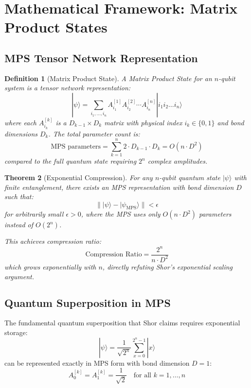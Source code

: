 \documentclass[12pt]{article}
\newtheorem{theorem}{Theorem}[section]
\newtheorem{definition}[theorem]{Definition}
\begin{document}
\section{Mathematical Framework: Matrix Product States}

\subsection{MPS Tensor Network Representation}

\begin{definition}[Matrix Product State]
A Matrix Product State for an $n$-qubit system is a tensor network representation:
\begin{equation}
|\psi\rangle = \sum_{i_1,\ldots,i_n} A^{[1]}_{i_1} A^{[2]}_{i_2} \cdots A^{[n]}_{i_n} |i_1 i_2 \ldots i_n\rangle
\end{equation}
where each $A^{[k]}_{i_k}$ is a $D_{k-1} \times D_k$ matrix with physical index $i_k \in \{0,1\}$ and bond dimensions $D_k$. The total parameter count is:
\begin{equation}
\text{MPS parameters} = \sum_{k=1}^n 2 \cdot D_{k-1} \cdot D_k = O(n \cdot D^2)
\end{equation}
compared to the full quantum state requiring $2^n$ complex amplitudes.
\end{definition}

\begin{theorem}[Exponential Compression]
For any $n$-qubit quantum state $|\psi\rangle$ with finite entanglement, there exists an MPS representation with bond dimension $D$ such that:
\begin{equation}
\||\psi\rangle - |\psi_{\text{MPS}}\rangle\| < \epsilon
\end{equation}
for arbitrarily small $\epsilon > 0$, where the MPS uses only $O(n \cdot D^2)$ parameters instead of $O(2^n)$.

This achieves compression ratio:
\begin{equation}
\text{Compression Ratio} = \frac{2^n}{n \cdot D^2}
\end{equation}
which grows exponentially with $n$, directly refuting Shor's exponential scaling argument.
\end{theorem}

\subsection{Quantum Superposition in MPS}

The fundamental quantum superposition that Shor claims requires exponential storage:
\begin{equation}
|\psi\rangle = \frac{1}{\sqrt{2^n}} \sum_{x=0}^{2^n-1} |x\rangle
\end{equation}
can be represented exactly in MPS form with bond dimension $D = 1$:
\begin{equation}
A^{[k]}_0 = A^{[k]}_1 = \frac{1}{\sqrt{2}} \quad \text{for all } k = 1, \ldots, n
\end{equation}
\end{document}
